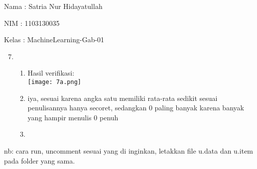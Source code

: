 \documentclass{article}
\begin{document}
Nama : Satria Nur Hidayatullah

NIM : 1103130035

Kelas : MachineLearning-Gab-01\\

\begin{enumerate}
	\setcounter{enumi}{6}
	\item
	\begin{enumerate}
		\item Hasil verifikasi:\\
			\texttt{[image: 7a.png]}
		\item iya, sesuai karena angka satu memiliki rata-rata sedikit sesuai penulisannya hanya secoret, sedangkan 0 paling banyak karena banyak yang hampir menulis 0 penuh
		\item 
	\end{enumerate}
\end{enumerate}
nb: cara run, uncomment sesuai yang di inginkan, letakkan file u.data dan u.item pada folder yang sama.
\end{document}
